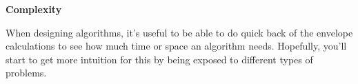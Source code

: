 \item {\bf Complexity }

When designing algorithms, it's useful to be able to do quick back of the
envelope calculations to see how much time or space an algorithm needs.
Hopefully, you'll start to get more intuition for this by being exposed to
different types of problems.

\begin{enumerate}

  

  

  

  

  

  

  

  

\end{enumerate}
